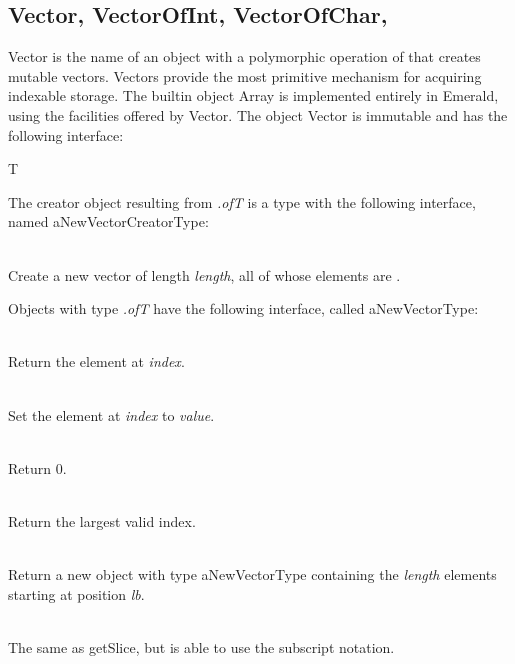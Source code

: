 \subsection{Vector, VectorOfInt, VectorOfChar, }
\label{builtin Vector}
Vector is the name of an object with a polymorphic operation of that creates
mutable vectors.  Vectors provide the most
primitive mechanism for acquiring indexable storage.  The builtin
object Array is implemented entirely in Emerald, using the facilities
offered by Vector.  The object Vector is immutable and has the following
interface:

\begin{desc}
  \item[\kw{function} of\/\LB{}T \CO{} \tn{Type}\/\RB{} \returns{} \/\LB{}aNewVectorCreatorType\/\RB{}]
     T
\end{desc}

\noindent The creator object resulting from {\it {}.of\/\LB{}T\/\RB{}}
is a type with the following interface, named aNewVectorCreatorType:

\begin{desc}
  \item[\kw{operation} create\/\LB{}length \CO{} \tn{Integer}\/\RB{} \returns{} \/\LB{}aNewVectorType\/\RB{}]~\\
    Create a new vector of length {\it length}, all of whose elements are
    .
\end{desc}

\noindent Objects with type {\it {}.of\/\LB{}T\/\RB{}} have the
following interface, called aNewVectorType:

\begin{desc}
  \item[\kw{function}  getElement\/\LB{}index \CO{} \tn{Integer}\/\RB{} \returns{} \/\LB{}T\/\RB{}]~\\
    Return the element at {\it index}.
  \item[\kw{operation} setElement\/\LB{}index \CO{} \tn{Integer}, value \CO{} T\/\RB{}]~\\
    Set the element at {\it index} to {\it value}.
  \item[\kw{function}  lowerbound \returns{} \/\LB{}\tn{Integer}\/\RB{}]~\\
    Return 0.
  \item[\kw{function}  upperbound \returns{} \/\LB{}\tn{Integer}\/\RB{}]~\\
    Return the largest valid index.
  \item[\kw{function}  getSlice\/\LB{}lb \CO{} \tn{Integer}, length\CO{} \tn{Integer}\/\RB{} \returns{} \/\LB{}aNewVectorType\/\RB{}]~\\
    Return a new object with type aNewVectorType containing the {\it length}
    elements starting at position {\it lb}.
  \item[\kw{function}  getElement\/\LB{}lb \CO{} \tn{Integer}, length\CO{} \tn{Integer}\/\RB{} \returns{} \/\LB{}aNewVectorType\/\RB{}]~\\
    The same as getSlice, but is able to use the subscript notation.
\end{desc}

